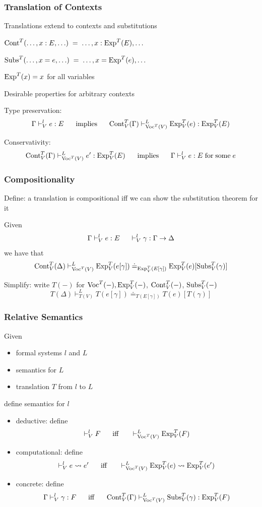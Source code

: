 \begin{frame}\frametitle{Translation of Contexts}
\begin{blockitems}{Translations extend to contexts and substitutions}
 \item $\mathrm{Cont}^T(\ldots,x:E,\ldots) \;=\;\ldots, x:\mathrm{Exp}^T(E), \ldots$
 \item $\mathrm{Subs}^T(\ldots,x=e,\ldots) \;=\;\ldots, x=\mathrm{Exp}^T(e), \ldots$
 \item $\mathrm{Exp}^T(x)=x$ for all variables
\end{blockitems}

\begin{blockitems}{Desirable properties for arbitrary contexts}
\item Type preservation:
\[\Gamma\vdash^l_V e:E \hspace*{.5cm}\;\mathrm{implies}\;\hspace*{.5cm} \mathrm{Cont}^T_V(\Gamma)\vdash^L_{\mathrm{Voc}^T(V)} \mathrm{Exp}^T_V(e):\mathrm{Exp}^T_V(E)\]
\item Conservativity:
\[\mathrm{Cont}^T_V(\Gamma)\vdash^L_{\mathrm{Voc}^T(V)} e':\mathrm{Exp}^T_V(E) \hspace*{.5cm}\;\mathrm{implies}\;\hspace*{.5cm} \Gamma\vdash^l_V e:E \;\mathrm{for}\;\mathrm{some}\; e\]
\end{blockitems}
\end{frame}

\begin{frame}\frametitle{Compositionality}
Define: a translation is compositional iff we can show the substitution theorem for it

Given
\[\Gamma\vdash^l_V e:E \hspace*{.5cm}\vdash^l_V \gamma:\Gamma\to\Delta\]
we have that
\[\mathrm{Cont}^T_V(\Delta)\vdash^L_{\mathrm{Voc}^T(V)}\mathrm{Exp}^T_V(e[\gamma])\doteq_{\mathrm{Exp}^T_V(E[\gamma])}\mathrm{Exp}^T_V(e)[\mathrm{Subs}^T_V(\gamma)] \]

Simplify: write
$T(-)$ for $\mathrm{Voc}^T(-), \mathrm{Exp}_V^T(-)$, $\mathrm{Cont}_V^T(-)$, $\mathrm{Subs}_V^T(-)$
\[T(\Delta)\vdash^L_{T(V)}T(e[\gamma])\doteq_{T(E[\gamma])}T(e)[T(\gamma)] \]
\end{frame}

\begin{frame}\frametitle{Relative Semantics}
Given
 \begin{itemize}
 \item formal systems $l$ and $L$
 \item semantics for $L$
 \item translation $T$ from $l$ to $L$
 \end{itemize}
define semantics for $l$
\medskip

\begin{itemize}
\item deductive: define
 \[\vdash^l_V F \hspace*{.5cm}\;\mathrm{iff}\;\hspace*{.5cm} \vdash^L_{\mathrm{Voc}^T(V)} \mathrm{Exp}^T_V(F) \]
\item computational: define
 \[\vdash^l_V e\rightsquigarrow e' \hspace*{.5cm}\;\mathrm{iff}\;\hspace*{.5cm} \vdash^L_{\mathrm{Voc}^T(V)}\mathrm{Exp}^T_V(e)\rightsquigarrow \mathrm{Exp}^T_V(e')\]
\item concrete: define
 \[\Gamma\vdash^l_V \gamma:F \hspace*{.5cm}\;\mathrm{iff}\;\hspace*{.5cm} \mathrm{Cont}^T_V(\Gamma)\vdash^L_{\mathrm{Voc}^T(V)}\mathrm{Subs}^T_V(\gamma):\mathrm{Exp}^T_V(F)\]
\end{itemize}
\end{frame}

